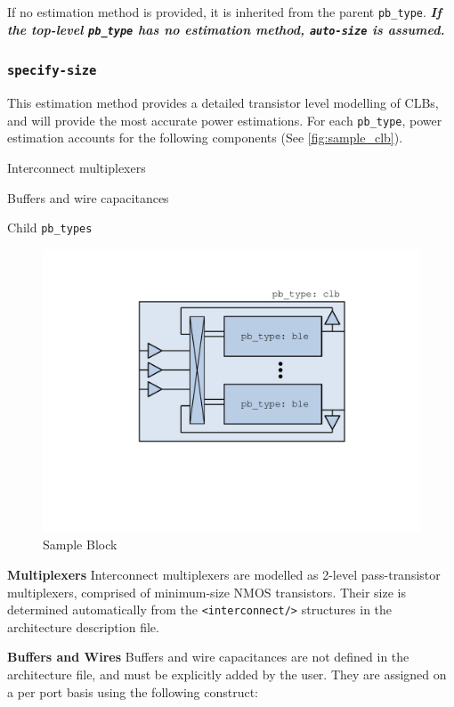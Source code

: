 \documentclass[letterpaper,twoside,10pt]{article}
\begin{document}
If no estimation method is provided, it is inherited from the parent \texttt{pb\_type}. \textit{\textbf{If the top-level \texttt{pb\_type} has no estimation method, \texttt{auto-size} is assumed.}}  

\subsubsection{\texttt{specify-size}}
This estimation method provides a detailed transistor level modelling of CLBs, and will provide the most accurate power estimations.  For each \texttt{pb\_type}, power estimation accounts for the following components (See \autoref{fig:sample_clb}).
\begin{itemize*}
	\item Interconnect multiplexers
	\item Buffers and wire capacitances
	\item Child \texttt{pb\_types}
\end{itemize*}

\begin{figure}[ht]
	\centering
		\includegraphics[scale=0.5]{images/sample_clb.pdf}
	\caption{Sample Block}
	\label{fig:sample_clb}
\end{figure}


\textbf{Multiplexers} Interconnect multiplexers are modelled as 2-level pass-transistor multiplexers, comprised of minimum-size NMOS transistors. Their size is determined automatically from the \texttt{<interconnect/>} structures in the architecture description file.  

\textbf{Buffers and Wires} Buffers and wire capacitances are not defined in the architecture file, and must be explicitly added by the user.  They are assigned on a per port basis using the following construct:
\end{document}

